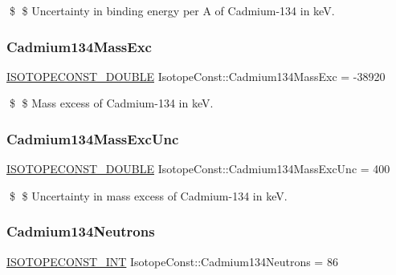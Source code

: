 \$ \$ Uncertainty in binding energy per A of Cadmium-\/134 in keV. \mbox{\label{group___isotope_const-_cadmium-_cd134_ga24aa74985d9d6656bfa20ec91e257be4}} 
\subsubsection{\texorpdfstring{Cadmium134\+Mass\+Exc}{Cadmium134MassExc}}
{\footnotesize\ttfamily \mbox{\hyperlink{group___isotope_const-_macros_ga8f45a7272ce02c0b4c65c44636ed719a}{I\+S\+O\+T\+O\+P\+E\+C\+O\+N\+S\+T\+\_\+\+D\+O\+U\+B\+LE}} Isotope\+Const\+::\+Cadmium134\+Mass\+Exc = -\/38920}

\$ \$ Mass excess of Cadmium-\/134 in keV. \mbox{\label{group___isotope_const-_cadmium-_cd134_ga609205e23900ae4616ee533c9e5a270f}} 
\subsubsection{\texorpdfstring{Cadmium134\+Mass\+Exc\+Unc}{Cadmium134MassExcUnc}}
{\footnotesize\ttfamily \mbox{\hyperlink{group___isotope_const-_macros_ga8f45a7272ce02c0b4c65c44636ed719a}{I\+S\+O\+T\+O\+P\+E\+C\+O\+N\+S\+T\+\_\+\+D\+O\+U\+B\+LE}} Isotope\+Const\+::\+Cadmium134\+Mass\+Exc\+Unc = 400}

\$ \$ Uncertainty in mass excess of Cadmium-\/134 in keV. \mbox{\label{group___isotope_const-_cadmium-_cd134_ga324f7f51c3fa6f9beeca48ec88b8d34b}} 
\subsubsection{\texorpdfstring{Cadmium134\+Neutrons}{Cadmium134Neutrons}}
{\footnotesize\ttfamily \mbox{\hyperlink{group___isotope_const-_macros_ga5f18360b3e99483a35c32d789e62621c}{I\+S\+O\+T\+O\+P\+E\+C\+O\+N\+S\+T\+\_\+\+I\+NT}} Isotope\+Const\+::\+Cadmium134\+Neutrons = 86}

